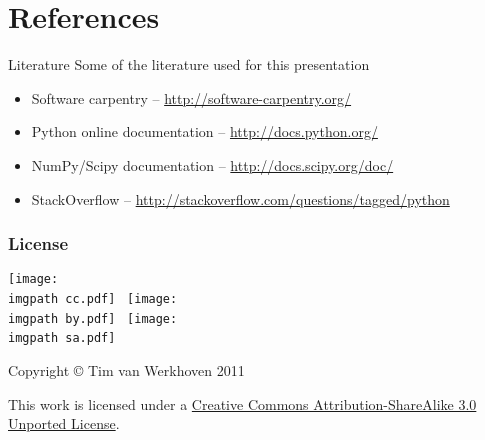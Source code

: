 \documentclass[xetex,10pt]{beamer}
\def\imgpath{./img/}
\begin{document}
\section*{References}

\begin{frame}{Literature}
	Some of the literature used for this presentation
	\vspace{1em}
	\begin{itemize}
		\item Software carpentry -- \url{http://software-carpentry.org/}
		\item Python online documentation -- \url{http://docs.python.org/}
		\item NumPy/Scipy documentation -- \url{http://docs.scipy.org/doc/}
		\item StackOverflow -- \url{http://stackoverflow.com/questions/tagged/python}
	\end{itemize}
	
\end{frame}

\begin{frame}
	\frametitle{License}

	\begin{center}
	\texttt{[image: \\imgpath cc.pdf]}~
	\texttt{[image: \\imgpath by.pdf]}~
	\texttt{[image: \\imgpath sa.pdf]}~
	
	Copyright © Tim van Werkhoven 2011
	
	This work is licensed under a \href{http://creativecommons.org/licenses/by-sa/3.0/}{Creative Commons Attribution-ShareAlike 3.0 Unported License}.

	\end{center}
	
\end{frame}
\end{document}
